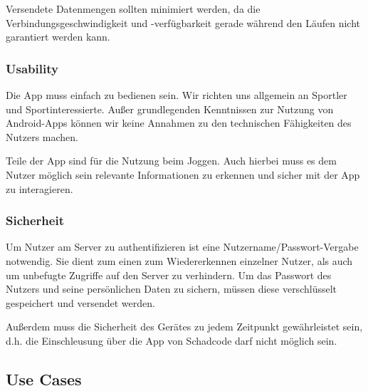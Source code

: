 Versendete Datenmengen sollten minimiert werden, da die Verbindungsgeschwindigkeit und -verfügbarkeit gerade während den Läufen nicht garantiert werden kann.
\subsubsection{Usability}
Die App muss einfach zu bedienen sein. Wir richten uns allgemein an Sportler und Sportinteressierte. Außer grundlegenden Kenntnissen zur Nutzung von Android-Apps können wir keine Annahmen zu den technischen Fähigkeiten des Nutzers machen.

Teile der App sind für die Nutzung beim Joggen. Auch hierbei muss es dem Nutzer möglich sein relevante Informationen zu erkennen und sicher mit der App zu interagieren.
\subsubsection{Sicherheit}
Um Nutzer am Server zu authentifizieren ist eine Nutzername/Passwort-Vergabe notwendig. Sie dient zum einen zum Wiedererkennen einzelner Nutzer, als auch um unbefugte Zugriffe auf den Server zu verhindern. Um das Passwort des Nutzers und seine persönlichen Daten zu sichern, müssen diese verschlüsselt gespeichert und versendet werden.

Außerdem muss die Sicherheit des Gerätes zu jedem Zeitpunkt gewährleistet sein, d.h. die Einschleusung über die App von Schadcode darf nicht möglich sein.
\subsection{Use Cases}
